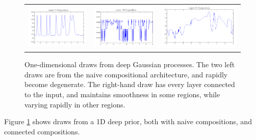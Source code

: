 \documentclass{article}
\begin{document}
\begin{figure}
\centering
\begin{tabular}{ccc}
\includegraphics[width=0.3\columnwidth]{figures/1d_samples/layer6} &
\includegraphics[width=0.3\columnwidth]{figures/1d_samples/composition} &
\includegraphics[width=0.3\columnwidth]{figures/1d_samples/connected} 
\end{tabular}
\caption{One-dimensional draws from deep Gaussian processes.  The two left draws are from the naive compositional architecture, and rapidly become degenerate.  The right-hand draw has every layer connected to the input, and maintains smoothness in some regions, while varying rapidly in other regions.}
\label{fig:deep_draw_1d}
\end{figure}

Figure \ref{fig:deep_draw_1d} shows draws from a 1D deep prior, both with naive compositions, and connected compositions.
\end{document}
